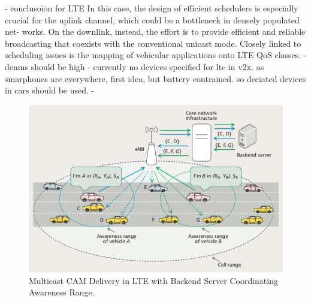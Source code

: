\documentclass[conference,12pt,onecolumn]{IEEEtran}
\begin{document}
- conclusoion for LTE
In this case, the design of efficient schedulers is especially crucial for the uplink channel, which could be a bottleneck in densely populated net- works. On the downlink, instead, the effort is to provide efficient and reliable broadcasting that coexists with the conventional unicast mode. Closely linked to scheduling issues is the mapping of vehicular applications onto LTE QoS classes.
- denms should be high
- currently no devices specified for lte in v2x. as smarphones are everywhere, first idea, but battery contrained. so deciated devices in cars should be used. \cite{araniti2013}
-

\begin{figure} [ht]
   \centering
   \includegraphics[width=0.6\linewidth]{_Graphics/lte_backendserver.png}
  \caption{Multicast CAM Delivery in LTE with Backend Server Coordinating Awareness Range. \cite{araniti2013}}
  \label{fig:lte_backendserver}
\end{figure}
\end{document}
